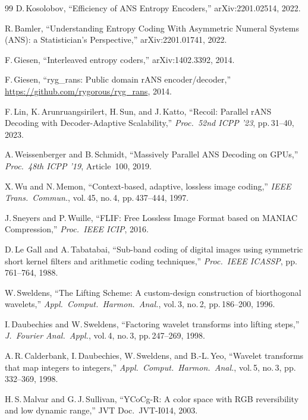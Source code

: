 \documentclass[journal]{IEEEtran}
\begin{document}
\begin{thebibliography}{99}
D.\,Kosolobov, ``Efficiency of ANS Entropy Encoders,''
arXiv:2201.02514, 2022.

R.\,Bamler, ``Understanding Entropy Coding With Asymmetric Numeral Systems
(ANS): a Statistician's Perspective,'' arXiv:2201.01741, 2022.

F.\,Giesen, ``Interleaved entropy coders,'' arXiv:1402.3392, 2014.

F.\,Giesen, ``ryg\_rans: Public domain rANS encoder/decoder,''
\url{https://github.com/rygorous/ryg_rans}, 2014.

F.\,Lin, K.\,Arunruangsirilert, H.\,Sun, and J.\,Katto,
``Recoil: Parallel rANS Decoding with Decoder-Adaptive Scalability,''
\textit{Proc.\ 52nd ICPP '23}, pp.\,31--40, 2023.

A.\,Weissenberger and B.\,Schmidt,
``Massively Parallel ANS Decoding on GPUs,''
\textit{Proc.\ 48th ICPP '19}, Article~100, 2019.

X.\,Wu and N.\,Memon,
``Context-based, adaptive, lossless image coding,''
\textit{IEEE Trans.\ Commun.}, vol.\,45, no.\,4, pp.\,437--444, 1997.

J.\,Sneyers and P.\,Wuille,
``FLIF: Free Lossless Image Format based on MANIAC Compression,''
\textit{Proc.\ IEEE ICIP}, 2016.

D.\,Le Gall and A.\,Tabatabai,
``Sub-band coding of digital images using symmetric short kernel filters and
arithmetic coding techniques,'' \textit{Proc.\ IEEE ICASSP}, pp.\,761--764,
1988.

W.\,Sweldens,
``The Lifting Scheme: A custom-design construction of biorthogonal wavelets,''
\textit{Appl.\ Comput.\ Harmon.\ Anal.}, vol.\,3, no.\,2, pp.\,186--200, 1996.

I.\,Daubechies and W.\,Sweldens,
``Factoring wavelet transforms into lifting steps,''
\textit{J.\ Fourier Anal.\ Appl.}, vol.\,4, no.\,3, pp.\,247--269, 1998.

A.\,R.\,Calderbank, I.\,Daubechies, W.\,Sweldens, and B.-L.\,Yeo,
``Wavelet transforms that map integers to integers,''
\textit{Appl.\ Comput.\ Harmon.\ Anal.}, vol.\,5, no.\,3, pp.\,332--369, 1998.

H.\,S.\,Malvar and G.\,J.\,Sullivan,
``YCoCg-R: A color space with RGB reversibility and low dynamic range,''
JVT Doc.\ JVT-I014, 2003.


\end{thebibliography}
\end{document}

